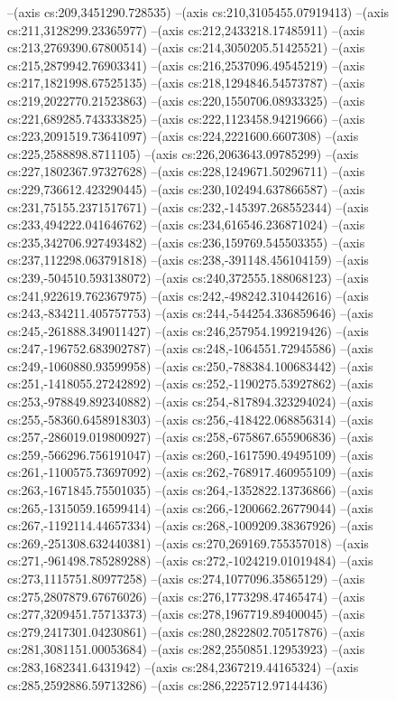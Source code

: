 --(axis cs:209,3451290.728535)
--(axis cs:210,3105455.07919413)
--(axis cs:211,3128299.23365977)
--(axis cs:212,2433218.17485911)
--(axis cs:213,2769390.67800514)
--(axis cs:214,3050205.51425521)
--(axis cs:215,2879942.76903341)
--(axis cs:216,2537096.49545219)
--(axis cs:217,1821998.67525135)
--(axis cs:218,1294846.54573787)
--(axis cs:219,2022770.21523863)
--(axis cs:220,1550706.08933325)
--(axis cs:221,689285.743333825)
--(axis cs:222,1123458.94219666)
--(axis cs:223,2091519.73641097)
--(axis cs:224,2221600.6607308)
--(axis cs:225,2588898.8711105)
--(axis cs:226,2063643.09785299)
--(axis cs:227,1802367.97327628)
--(axis cs:228,1249671.50296711)
--(axis cs:229,736612.423290445)
--(axis cs:230,102494.637866587)
--(axis cs:231,75155.2371517671)
--(axis cs:232,-145397.268552344)
--(axis cs:233,494222.041646762)
--(axis cs:234,616546.236871024)
--(axis cs:235,342706.927493482)
--(axis cs:236,159769.545503355)
--(axis cs:237,112298.063791818)
--(axis cs:238,-391148.456104159)
--(axis cs:239,-504510.593138072)
--(axis cs:240,372555.188068123)
--(axis cs:241,922619.762367975)
--(axis cs:242,-498242.310442616)
--(axis cs:243,-834211.405757753)
--(axis cs:244,-544254.336859646)
--(axis cs:245,-261888.349011427)
--(axis cs:246,257954.199219426)
--(axis cs:247,-196752.683902787)
--(axis cs:248,-1064551.72945586)
--(axis cs:249,-1060880.93599958)
--(axis cs:250,-788384.100683442)
--(axis cs:251,-1418055.27242892)
--(axis cs:252,-1190275.53927862)
--(axis cs:253,-978849.892340882)
--(axis cs:254,-817894.323294024)
--(axis cs:255,-58360.6458918303)
--(axis cs:256,-418422.068856314)
--(axis cs:257,-286019.019800927)
--(axis cs:258,-675867.655906836)
--(axis cs:259,-566296.756191047)
--(axis cs:260,-1617590.49495109)
--(axis cs:261,-1100575.73697092)
--(axis cs:262,-768917.460955109)
--(axis cs:263,-1671845.75501035)
--(axis cs:264,-1352822.13736866)
--(axis cs:265,-1315059.16599414)
--(axis cs:266,-1200662.26779044)
--(axis cs:267,-1192114.44657334)
--(axis cs:268,-1009209.38367926)
--(axis cs:269,-251308.632440381)
--(axis cs:270,269169.755357018)
--(axis cs:271,-961498.785289288)
--(axis cs:272,-1024219.01019484)
--(axis cs:273,1115751.80977258)
--(axis cs:274,1077096.35865129)
--(axis cs:275,2807879.67676026)
--(axis cs:276,1773298.47465474)
--(axis cs:277,3209451.75713373)
--(axis cs:278,1967719.89400045)
--(axis cs:279,2417301.04230861)
--(axis cs:280,2822802.70517876)
--(axis cs:281,3081151.00053684)
--(axis cs:282,2550851.12953923)
--(axis cs:283,1682341.6431942)
--(axis cs:284,2367219.44165324)
--(axis cs:285,2592886.59713286)
--(axis cs:286,2225712.97144436)
